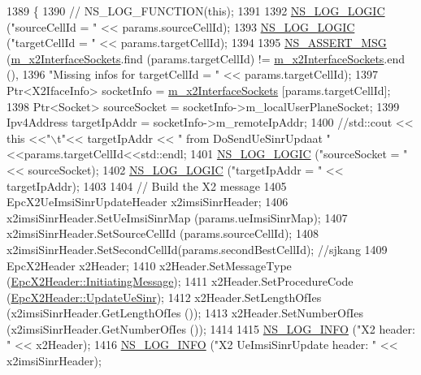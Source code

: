\begin{DoxyCode}
1389 \{
1390  \textcolor{comment}{// NS\_LOG\_FUNCTION(this);}
1391 
1392   \hyperlink{group__logging_ga88acd260151caf2db9c0fc84997f45ce}{NS\_LOG\_LOGIC} (\textcolor{stringliteral}{"sourceCellId = "} << params.sourceCellId);
1393   \hyperlink{group__logging_ga88acd260151caf2db9c0fc84997f45ce}{NS\_LOG\_LOGIC} (\textcolor{stringliteral}{"targetCellId = "} << params.targetCellId);
1394 
1395   \hyperlink{assert_8h_aff5ece9066c74e681e74999856f08539}{NS\_ASSERT\_MSG} (\hyperlink{classns3_1_1EpcX2_a0665276228b9b99a52ef6d5e9bdb306d}{m\_x2InterfaceSockets}.find (params.targetCellId) != 
      \hyperlink{classns3_1_1EpcX2_a0665276228b9b99a52ef6d5e9bdb306d}{m\_x2InterfaceSockets}.end (),
1396                  \textcolor{stringliteral}{"Missing infos for targetCellId = "} << params.targetCellId);
1397   Ptr<X2IfaceInfo> socketInfo = \hyperlink{classns3_1_1EpcX2_a0665276228b9b99a52ef6d5e9bdb306d}{m\_x2InterfaceSockets} [params.targetCellId];
1398   Ptr<Socket> sourceSocket = socketInfo->m\_localUserPlaneSocket;
1399   Ipv4Address targetIpAddr = socketInfo->m\_remoteIpAddr;
1400 \textcolor{comment}{//std::cout << this <<"\(\backslash\)t"<<  targetIpAddr << " from  DoSendUeSinrUpdaat "<<params.targetCellId<<std::endl;}
1401   \hyperlink{group__logging_ga88acd260151caf2db9c0fc84997f45ce}{NS\_LOG\_LOGIC} (\textcolor{stringliteral}{"sourceSocket = "} << sourceSocket);
1402   \hyperlink{group__logging_ga88acd260151caf2db9c0fc84997f45ce}{NS\_LOG\_LOGIC} (\textcolor{stringliteral}{"targetIpAddr = "} << targetIpAddr);
1403 
1404   \textcolor{comment}{// Build the X2 message}
1405   EpcX2UeImsiSinrUpdateHeader x2imsiSinrHeader;
1406   x2imsiSinrHeader.SetUeImsiSinrMap (params.ueImsiSinrMap);
1407   x2imsiSinrHeader.SetSourceCellId (params.sourceCellId);
1408   x2imsiSinrHeader.SetSecondCellId(params.secondBestCellId); \textcolor{comment}{//sjkang}
1409   EpcX2Header x2Header;
1410   x2Header.SetMessageType (\hyperlink{classns3_1_1EpcX2Header_a0e69b043a20eaee4c570f223f4eca715a5761e50c3c1918a44e3a5ebc86f17435}{EpcX2Header::InitiatingMessage});
1411   x2Header.SetProcedureCode (\hyperlink{classns3_1_1EpcX2Header_afd178c1ed3c47948c587955698a15b0da031eb5cb9e5a3611fbf6476448d6549f}{EpcX2Header::UpdateUeSinr});
1412   x2Header.SetLengthOfIes (x2imsiSinrHeader.GetLengthOfIes ());
1413   x2Header.SetNumberOfIes (x2imsiSinrHeader.GetNumberOfIes ());
1414 
1415   \hyperlink{group__logging_gafbd73ee2cf9f26b319f49086d8e860fb}{NS\_LOG\_INFO} (\textcolor{stringliteral}{"X2 header: "} << x2Header);
1416   \hyperlink{group__logging_gafbd73ee2cf9f26b319f49086d8e860fb}{NS\_LOG\_INFO} (\textcolor{stringliteral}{"X2 UeImsiSinrUpdate header: "} << x2imsiSinrHeader);

\end{DoxyCode}
